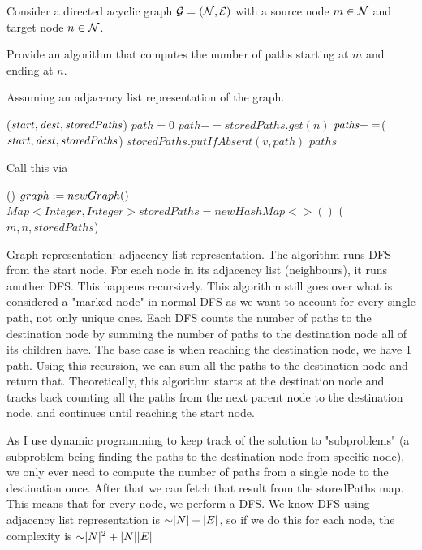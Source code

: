 \begin{problem}
Consider a directed acyclic graph $\mathcal{G} = (\mathcal{N}, \mathcal{E})$ with a source node $m \in \mathcal{N}$ and target node $n \in \mathcal{N}$.
\begin{questions}
\item Provide an algorithm that computes the number of paths starting at $m$ and ending at $n$.

Assuming an adjacency list representation of the graph.

\begin{myalgo}{($\textit{start\/},\textit{dest\/},\textit{storedPaths\/}$)}
  \ENDIF
  \STATE $path = 0$
      \STATE $path += storedPaths.get(n)$
    \ELSE{}
      \STATE $\textit{paths\/} += $($\textit{start\/},\textit{dest\/},\textit{storedPaths\/}$)
    \ENDIF
  \ENDFOR
  \STATE $storedPaths.putIfAbsent(v, path)$
  \RETURN $paths$
\end{myalgo}

Call this via 

\begin{myalgo}{()}
  \STATE $graph := new Graph()$  
  \STATE $Map<Integer, Integer> storedPaths = new HashMap<>()$
  \PRINT {}($m, n, storedPaths$)
\end{myalgo}

Graph representation: adjacency list representation. The algorithm runs DFS from the start node. For each node in its adjacency list (neighbours), it runs another DFS. This happens recursively.
This algorithm still goes over what is considered a "marked node" in normal DFS as we want to account for every single path, not only unique ones. Each DFS counts the number of paths to the destination node by summing the number of paths to the destination node all of its children have.
The base case is when reaching the destination node, we have 1 path. Using this recursion, we can sum all the paths to the destination node and return that.
Theoretically, this algorithm starts at the destination node and tracks back counting all the paths from the next parent node to the destination node, and continues until reaching the start node.

As I use dynamic programming to keep track of the solution to "subproblems" (a subproblem being finding the paths to the destination node from specific node), we only ever need to compute the number of paths from a single node to the destination once. After that we can fetch that result from the storedPaths map.
This means that for every node, we perform a DFS. We know DFS using adjacency list representation is $\mathord{\sim}|N| + |E|$, so if we do this for each node, the complexity is $\mathord{\sim}|N|^2 + |N||E|$


\end{questions}
\end{problem}

